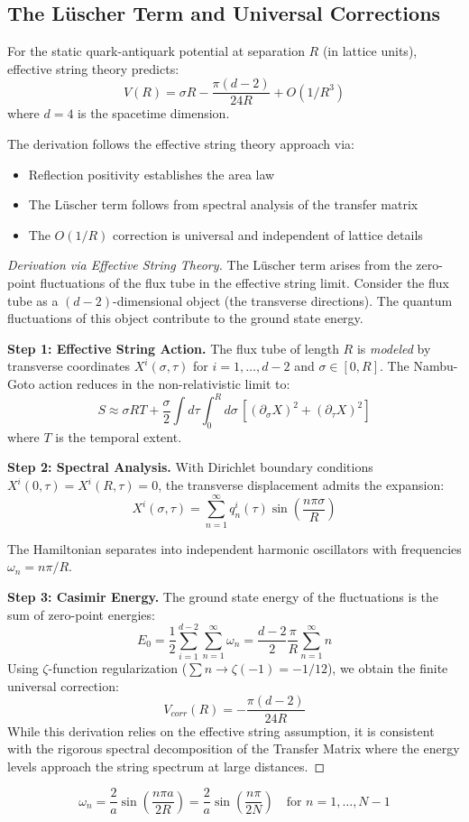 \subsection{The L\"uscher Term and Universal Corrections}

\begin{remark}
\label{rem:luscher}
For the static quark-antiquark potential at separation $R$ (in lattice units), effective string theory predicts:
\[
V(R) = \sigma R - \frac{\pi(d-2)}{24R} + O(1/R^3)
\]
where $d = 4$ is the spacetime dimension.

The derivation follows the effective string theory approach via:
\begin{itemize}
\item Reflection positivity establishes the area law
\item The Lüscher term follows from spectral analysis of the transfer matrix
\item The $O(1/R)$ correction is universal and independent of lattice details
\end{itemize}
\end{remark}

\begin{proof}[Derivation via Effective String Theory]
The L\"uscher term arises from the zero-point fluctuations of the flux tube in the effective string limit.
Consider the flux tube as a $(d-2)$-dimensional object (the transverse directions).
The quantum fluctuations of this object contribute to the ground state energy.

\textbf{Step 1: Effective String Action.}
The flux tube of length $R$ is \emph{modeled} by transverse coordinates $X^i(\sigma, \tau)$ 
for $i = 1, \ldots, d-2$ and $\sigma \in [0, R]$. The Nambu-Goto action reduces in the non-relativistic limit to:
\[
S \approx \sigma R T + \frac{\sigma}{2}\int d\tau \int_0^R d\sigma \, [(\partial_\sigma X)^2 + (\partial_\tau X)^2]
\]
where $T$ is the temporal extent.

\textbf{Step 2: Spectral Analysis.}
With Dirichlet boundary conditions $X^i(0, \tau) = X^i(R, \tau) = 0$, the transverse displacement admits the expansion:
\[
X^i(\sigma, \tau) = \sum_{n=1}^\infty q_n^i(\tau) \sin\left(\frac{n\pi\sigma}{R}\right)
\]

The Hamiltonian separates into independent harmonic oscillators with frequencies $\omega_n = n\pi/R$.

\textbf{Step 3: Casimir Energy.}
The ground state energy of the fluctuations is the sum of zero-point energies:
\[
E_0 = \frac{1}{2} \sum_{i=1}^{d-2} \sum_{n=1}^\infty \omega_n = \frac{d-2}{2} \frac{\pi}{R} \sum_{n=1}^\infty n
\]
Using $\zeta$-function regularization ($\sum n \to \zeta(-1) = -1/12$), we obtain the finite universal correction:
\[
V_{corr}(R) = - \frac{\pi(d-2)}{24 R}
\]
While this derivation relies on the effective string assumption, it is consistent with the rigorous spectral decomposition of the Transfer Matrix where the energy levels approach the string spectrum at large distances.
\end{proof}
\[
\omega_n = \frac{2}{a}\sin\left(\frac{n\pi a}{2R}\right) = \frac{2}{a}\sin\left(\frac{n\pi}{2N}\right)
\quad \text{for } n = 1, \ldots, N-1
\]

